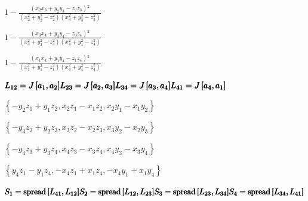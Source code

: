 \documentclass{article}
\begin{document}
\begin{doublespace}
\noindent\(1-\frac{\left(x_2 x_3+y_2 y_3-z_2 z_3\right){}^2}{\left(x_2^2+y_2^2-z_2^2\right) \left(x_3^2+y_3^2-z_3^2\right)}\)
\end{doublespace}

\begin{doublespace}
\noindent\(1-\frac{\left(x_3 x_4+y_3 y_4-z_3 z_4\right){}^2}{\left(x_3^2+y_3^2-z_3^2\right) \left(x_4^2+y_4^2-z_4^2\right)}\)
\end{doublespace}

\begin{doublespace}
\noindent\(1-\frac{\left(x_1 x_4+y_1 y_4-z_1 z_4\right){}^2}{\left(x_1^2+y_1^2-z_1^2\right) \left(x_4^2+y_4^2-z_4^2\right)}\)
\end{doublespace}

\begin{doublespace}
\noindent\(\pmb{L_{12} = J\left[a_1,a_2\right]}\\
\pmb{L_{23} = J\left[a_2,a_3\right]}\\
\pmb{L_{34} = J\left[a_3,a_4\right]}\\
\pmb{L_{41} = J\left[a_4,a_1\right]}\)
\end{doublespace}

\begin{doublespace}
\noindent\(\left\{-y_2 z_1+y_1 z_2,x_2 z_1-x_1 z_2,x_2 y_1-x_1 y_2\right\}\)
\end{doublespace}

\begin{doublespace}
\noindent\(\left\{-y_3 z_2+y_2 z_3,x_3 z_2-x_2 z_3,x_3 y_2-x_2 y_3\right\}\)
\end{doublespace}

\begin{doublespace}
\noindent\(\left\{-y_4 z_3+y_3 z_4,x_4 z_3-x_3 z_4,x_4 y_3-x_3 y_4\right\}\)
\end{doublespace}

\begin{doublespace}
\noindent\(\left\{y_4 z_1-y_1 z_4,-x_4 z_1+x_1 z_4,-x_4 y_1+x_1 y_4\right\}\)
\end{doublespace}

\begin{doublespace}
\noindent\(\pmb{S_1=\text{spread}\left[L_{41},L_{12}\right]}\\
\pmb{S_2=\text{spread}\left[L_{12},L_{23}\right]}\\
\pmb{S_3=\text{spread}\left[L_{23},L_{34}\right]}\\
\pmb{S_4=\text{spread}\left[L_{34},L_{41}\right]}\)
\end{doublespace}
\end{document}
